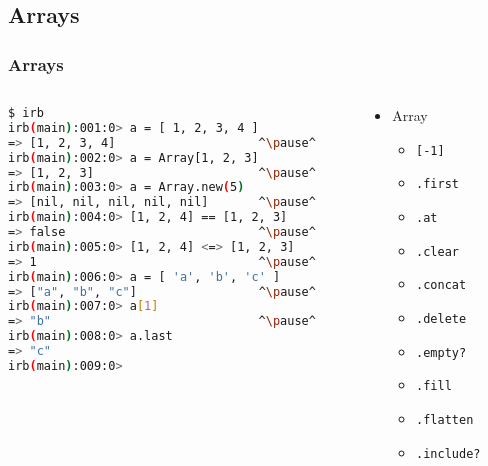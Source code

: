 \subsection{Arrays}
\begin{frame}[fragile]\frametitle{Arrays}

\begin{columns}[c] 

\begin{column}{8cm}
\begin{lstlisting}[language=bash, escapechar={^}]
$ irb
irb(main):001:0> a = [ 1, 2, 3, 4 ]
=> [1, 2, 3, 4]                    ^\pause^
irb(main):002:0> a = Array[1, 2, 3]
=> [1, 2, 3]                       ^\pause^
irb(main):003:0> a = Array.new(5)
=> [nil, nil, nil, nil, nil]       ^\pause^
irb(main):004:0> [1, 2, 4] == [1, 2, 3]
=> false                           ^\pause^
irb(main):005:0> [1, 2, 4] <=> [1, 2, 3]
=> 1                               ^\pause^
irb(main):006:0> a = [ 'a', 'b', 'c' ]
=> ["a", "b", "c"]                 ^\pause^
irb(main):007:0> a[1]
=> "b"                             ^\pause^
irb(main):008:0> a.last
=> "c"
irb(main):009:0> 
\end{lstlisting}
\end{column}

\pause

\begin{column}{3.5cm}
\begin{itemize}

\item Array
\begin{itemize}
\item \texttt{[-1]}
\item \texttt{.first}
\item \texttt{.at}
\item \texttt{.clear}
\item \texttt{.concat}
\item \texttt{.delete}
\item \texttt{.empty?}
\item \texttt{.fill}
\item \texttt{.flatten}
\item \texttt{.include?}
\end{itemize}

\end{itemize}
\end{column}

\end{columns}

\end{frame}





